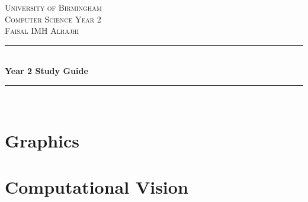 \documentclass[12pt, a4paper, oneside, titlepage]{report}
\begin{document}
		\begin{titlepage}
		\newcommand{\HRule}{\rule{\linewidth}{0.5mm}} %
		
		\center %
		
		
		\textsc{\LARGE University of Birmingham}\\[1.5cm] %
		\textsc{\Large Computer Science Year 2}\\[0.5cm] %
		\textsc{\Large Faisal IMH Alrajhi}\\[0.5cm]
		
		
		\HRule \\[0.4cm]
		{ \huge \bfseries Year 2 Study Guide}\\[0.4cm] %
		\HRule \\[1.5cm]
		
		
		
		
		\vfill %
		
	\end{titlepage}

\newpage
\tableofcontents
\newpage
{}

\chapter{Graphics}

\chapter{Computational Vision}

\end{document}
